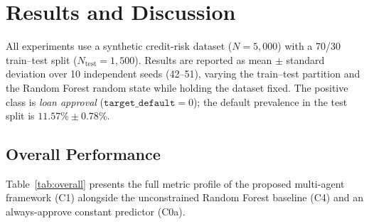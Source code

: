 
\section{Results and Discussion}

All experiments use a synthetic credit-risk dataset ($N{=}5{,}000$) with a
70/30 train--test split ($N_{\text{test}}{=}1{,}500$). Results are reported as
mean $\pm$ standard deviation over 10 independent seeds (42--51), varying
the train--test partition and the Random Forest random state while holding the
dataset fixed. The positive class is \emph{loan approval}
($\texttt{target\_default}{=}0$); the default prevalence in the test split is
$11.57\% \pm 0.78\%$.

\subsection{Overall Performance}

Table~\ref{tab:overall} presents the full metric profile of the proposed
multi-agent framework (C1) alongside the unconstrained Random Forest baseline
(C4) and an always-approve constant predictor (C0a).

